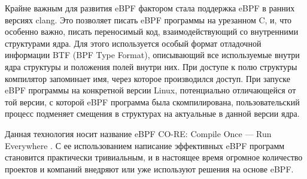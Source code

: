 Крайне важным для развития eBPF фактором стала поддержка eBPF в ранних версиях clang.
Это позволяет писать eBPF программы на урезанном C, и, что особенно важно, писать переносимый код, взаимодействующий со внутренними
структурами ядра. Для этого используется особый формат отладочной информации BTF (BPF Type Format), описывающий все используемые внутри
ядра структуры и положения полей внутри них. При доступе к полю структуры компилятор запоминает имя, через которое производился доступ.
При запуске eBPF программы на конкретной версии Linux, потенциально отличающейся от той версии, с которой eBPF программа была
скомпилирована, пользовательский процесс подменяет смещения в структурах на актуальные в данной версии ядра.

Данная технология носит название eBPF CO-RE: Compile Once --- Run Everywhere \cite{ebpf:core}.
С ее использованием написание эффективных eBPF программ становится практически тривиальным, и в настоящее время
огромное количество проектов и компаний внедряют или уже используют решения на основе eBPF.
